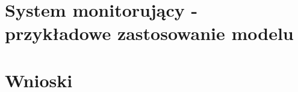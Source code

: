 \documentclass[inzynierska]{pwr_wmat_praca_dyplomowa}
\theoremstyle{plain}
\numberwithin{theorem}{chapter}
\theoremstyle{definition}
\numberwithin{theorem}{chapter}
\begin{document}




\chapter{System monitorujący - przykładowe zastosowanie modelu}
{\backmatter \chapter{Wnioski}}
\newpage
\end{document}
